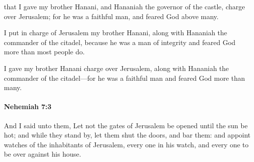 			\begin{versebox}
					\item[BHS] 
					\item[LXX] 
					\item[ASV] that I gave my brother Hanani, and Hananiah the governor of the castle, charge over Jerusalem; for he was a faithful man, and feared God above many.
					\item[NIV] I put in charge of Jerusalem my brother Hanani, along with Hananiah the commander of the citadel, because he was a man of integrity and feared God more than most people do.
					\item[NRSV] I gave my brother Hanani charge over Jerusalem, along with Hananiah the commander of the citadel—for he was a faithful man and feared God more than many.
			\end{versebox}

		\paragraph{Nehemiah 7:3} %
			\label{NEHEMIAH-7-3}

			And I said unto them, Let not the gates of Jerusalem be opened until the sun be hot; and while they stand by, let them shut the doors, and bar them: and appoint watches of the inhabitants of Jerusalem, every one in his watch, and every one to be over against his house.

